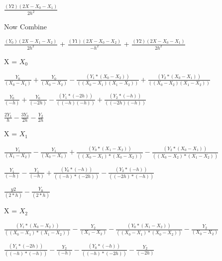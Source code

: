 \documentclass{report}
\begin{document}
\begin{center}
$\frac{(Y2)(2X - X_0 - X_1)}{2h^2}$
\end{center}

\begin{center}
Now Combine
\end{center}

\begin{center}
$\frac{(Y_0)(2X - X_1 - X_2)}{2h^2}$ + $\frac{(Y1)(2X - X_0 - X_2)}{-h^2}$ + $\frac{(Y2)(2X - X_0 - X_1)}{2h^2}$
\end{center}

X = $X_0$

\begin{center}
$\frac{Y_0}{(X_0 - X_1)} + \frac{Y_0}{(X_0 - X_2)} - \frac{(Y_1*(X_0 - X_2))}{((X_0 - X_1)(X_1 - X_2))} + \frac{(Y_2*(X_0 - X_1))}{((X_0 - X_2)(X_1 - X_2))}$
\end{center}

\begin{center}
$\frac{Y_0}{(-h)} + \frac{Y_0}{(-2h)} - \frac{(Y_1*(-2h))}{((-h)(-h))} + \frac{(Y_2*(-h))}{((-2h)(-h))}$
\end{center}

\begin{center}
$\frac{2Y_1}{h} - \frac{3Y_0}{2h} - \frac{Y_2}{2h}$
\end{center}

X = $X_1$

\begin{center}
$\frac{Y_1}{(X_1 - X_2)} - \frac{Y_1}{(X_0 - X_1)} + \frac{(Y_0*(X_1 - X_2))}{((X_0 - X_1)*(X_0 - X_2))} - \frac{(Y_2*(X_0 - X_1))}{((X_0 - X_2)*(X_1 - X_2))}$
\end{center}

\begin{center}
$\frac{Y_1}{(-h)} - \frac{Y_1}{(-h)} + \frac{(Y_0*(-h))}{((-h)*(-2h))} - \frac{(Y_2*(-h))}{((-2h)*(-h))}$
\end{center}

\begin{center}
$\frac{y2}{(2*h)} - \frac{Y_0}{(2*h)}$
\end{center}

X = $X_2$

\begin{center}
$\frac{(Y_1*(X_0 - X_2))}{((X_0 - X_1)*(X_1 - X_2))} - \frac{Y_2}{(X_1 - X_2)} - \frac{(Y_0*(X_1 - X_2))}{((X_0 - X_1)*(X_0 - X_2))} - \frac{Y_2}{(X_0 - X_2)}$
\end{center}

\begin{center}
$\frac{(Y_1*(-2h))}{((-h)*(-h))} - \frac{Y_2}{(-h)} - \frac{(Y_0*(-h))}{((-h)*(-2h))} - \frac{Y_2}{(-2h)}$
\end{center}
\end{document}
